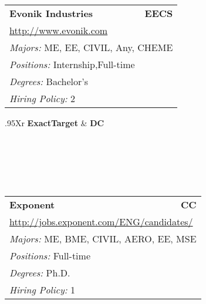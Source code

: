 \documentclass[twoside]{article}
\begin{document}
\begin{center}
\begin{multicols}{3}
\begin{FlushLeft}
\begin{minipage}{\columnwidth}
\end{minipage}
 
\begin{minipage}{\columnwidth}\begin{tabularx}{.95\columnwidth}{Xr}
                 {\Large\bf Evonik Industries} & {\Large\bf EECS}\\
    \multicolumn{2}{p{.95\columnwidth}}{\url{http://www.evonik.com}}\\
    \multicolumn{2}{p{.95\columnwidth}}{\emph{Majors:} ME, EE, CIVIL, Any, CHEME}\\
    \multicolumn{2}{p{.95\columnwidth}}{\emph{Positions:} Internship,Full-time}\\
    \multicolumn{2}{p{.95\columnwidth}}{\emph{Degrees:} Bachelor's}\\
    \multicolumn{2}{p{.95\columnwidth}}{\emph{Hiring Policy:} 2}\\
    \end{tabularx}
    
\end{minipage}
 
\begin{minipage}{\columnwidth}\begin{tabularx}{.95\columnwidth}{Xr}
                 {\Large\bf ExactTarget} & {\Large\bf DC}\\
    \\
    \\
    \\
    \\
    \\
    \end{tabularx}
    
\end{minipage}
 
\begin{minipage}{\columnwidth}\begin{tabularx}{.95\columnwidth}{Xr}
                 {\Large\bf Exponent} & {\Large\bf CC}\\
    \multicolumn{2}{p{.95\columnwidth}}{\url{http://jobs.exponent.com/ENG/candidates/}}\\
    \multicolumn{2}{p{.95\columnwidth}}{\emph{Majors:} ME, BME, CIVIL, AERO, EE, MSE}\\
    \multicolumn{2}{p{.95\columnwidth}}{\emph{Positions:} Full-time}\\
    \multicolumn{2}{p{.95\columnwidth}}{\emph{Degrees:} Ph.D.}\\
    \multicolumn{2}{p{.95\columnwidth}}{\emph{Hiring Policy:} 1}\\
    \end{tabularx}
    

\end{minipage}
\end{FlushLeft}
\end{multicols}
\end{center}
\end{document}
